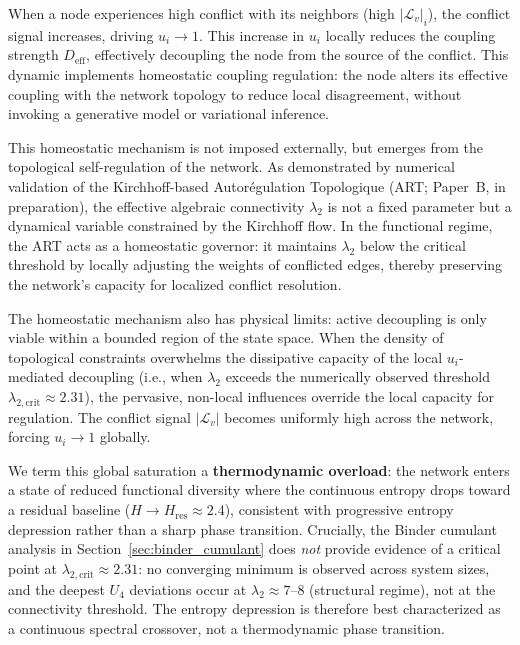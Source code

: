 \documentclass[11pt]{article}
\begin{document}
When a node experiences high conflict with its neighbors (high $|\mathcal{L}_v|_i$), the conflict signal increases, driving $u_i \to 1$. This increase in $u_i$ locally reduces the coupling strength $D_{\text{eff}}$, effectively decoupling the node from the source of the conflict. This dynamic implements homeostatic coupling regulation: the node alters its effective coupling with the network topology to reduce local disagreement, without invoking a generative model or variational inference.

This homeostatic mechanism is not imposed externally, but emerges from the topological self-regulation of the network. As demonstrated by numerical validation of the Kirchhoff-based Autorégulation Topologique (ART; Paper~B, in preparation), the effective algebraic connectivity $\lambda_2$ is not a fixed parameter but a dynamical variable constrained by the Kirchhoff flow. In the functional regime, the ART acts as a homeostatic governor: it maintains $\lambda_2$ below the critical threshold by locally adjusting the weights of conflicted edges, thereby preserving the network's capacity for localized conflict resolution.

The homeostatic mechanism also has physical limits: active decoupling is only viable within a bounded region of the state space. When the density of topological constraints overwhelms the dissipative capacity of the local $u_i$-mediated decoupling (i.e., when $\lambda_2$ exceeds the numerically observed threshold $\lambda_{2,\mathrm{crit}} \approx 2.31$), the pervasive, non-local influences override the local capacity for regulation. The conflict signal $|\mathcal{L}_v|$ becomes uniformly high across the network, forcing $u_i \to 1$ globally.

We term this global saturation a \textbf{thermodynamic overload}: the network enters a state of reduced functional diversity where the continuous entropy drops toward a residual baseline ($H \to H_{\mathrm{res}} \approx 2.4$), consistent with progressive entropy depression rather than a sharp phase transition. Crucially, the Binder cumulant analysis in Section~\ref{sec:binder_cumulant} does \emph{not} provide evidence of a critical point at $\lambda_{2,\mathrm{crit}} \approx 2.31$: no converging minimum is observed across system sizes, and the deepest $U_4$ deviations occur at $\lambda_2 \approx 7$--$8$ (structural regime), not at the connectivity threshold. The entropy depression is therefore best characterized as a continuous spectral crossover, not a thermodynamic phase transition.
\end{document}
